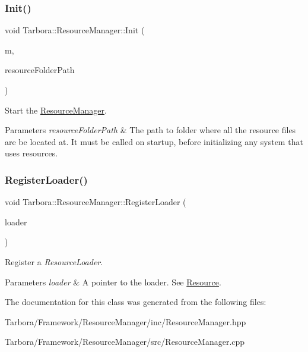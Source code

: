 \subsubsection{\texorpdfstring{Init()}{Init()}}
{\footnotesize\ttfamily void Tarbora\+::\+Resource\+Manager\+::\+Init (\begin{DoxyParamCaption}\item[{\hyperlink{classTarbora_1_1Module}{Module} $\ast$}]{m,  }\item[{const std\+::string}]{resource\+Folder\+Path }\end{DoxyParamCaption})\hspace{0.3cm}{\ttfamily [static]}}



Start the \hyperlink{classTarbora_1_1ResourceManager}{Resource\+Manager}. 


\begin{DoxyParams}{Parameters}
{\em resource\+Folder\+Path} & The path to folder where all the resource files are be located at. It must be called on startup, before initializing any system that uses resources. \\
\hline
\end{DoxyParams}
\mbox{\label{classTarbora_1_1ResourceManager_a531683525f49833ac4b06916cd8a2bc8}} 
\subsubsection{\texorpdfstring{Register\+Loader()}{RegisterLoader()}}
{\footnotesize\ttfamily void Tarbora\+::\+Resource\+Manager\+::\+Register\+Loader (\begin{DoxyParamCaption}\item[{Loader\+Ptr}]{loader }\end{DoxyParamCaption})\hspace{0.3cm}{\ttfamily [static]}}



Register a {\itshape Resource\+Loader}. 


\begin{DoxyParams}{Parameters}
{\em loader} & A pointer to the loader. See \hyperlink{classTarbora_1_1Resource}{Resource}. \\
\hline
\end{DoxyParams}


The documentation for this class was generated from the following files\+:\begin{DoxyCompactItemize}
\item 
Tarbora/\+Framework/\+Resource\+Manager/inc/Resource\+Manager.\+hpp\item 
Tarbora/\+Framework/\+Resource\+Manager/src/Resource\+Manager.\+cpp\end{DoxyCompactItemize}
